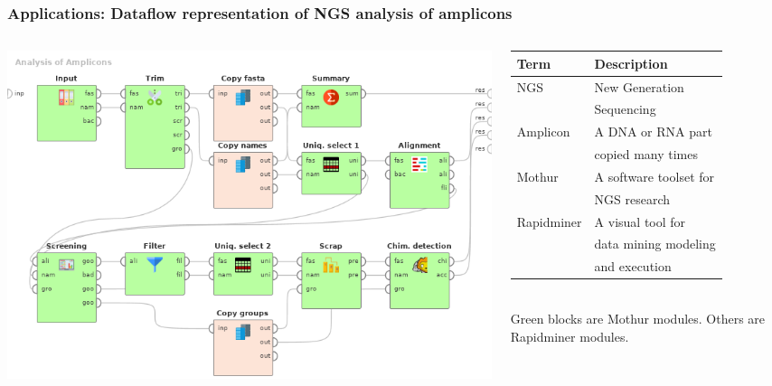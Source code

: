 \documentclass[10pt]{beamer}
\begin{document}


\begin{frame}
  \frametitle{Applications: Dataflow representation of NGS analysis of amplicons}
  \begin{columns}
    \begin{column}{0.6\textwidth}
      \begin{raggedright}
        \includegraphics[width=1\linewidth]{Dataflow-color-en.png}
      \end{raggedright}
    \end{column}
    \begin{column}{0.4\textwidth}\footnotesize
      \begin{tabular}{ll}
        Term & Description \\
        \hline
        NGS & New Generation\\ & Sequencing\\
        Amplicon & A DNA or RNA part \\
                 & copied many times \\
        Mothur & A software toolset for\\ & NGS research \\
        Rapidminer & A visual tool for \\
             & data mining modeling\\
             &  and execution
      \end{tabular}
      ${}$\\[1em]
      Green blocks are Mothur modules. Others are Rapidminer modules.
    \end{column}
  \end{columns}
\end{frame}
\end{document}
